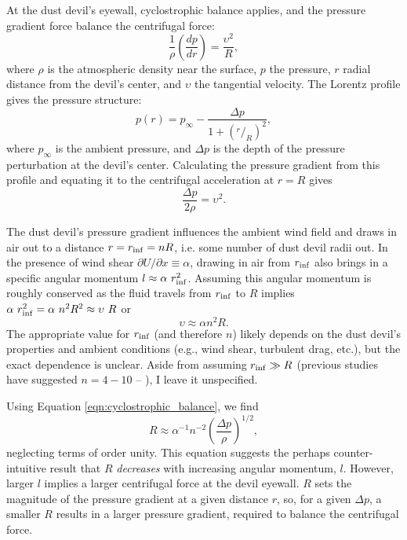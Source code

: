 \documentclass{aastex63}
\begin{document}
At the dust devil's eyewall, cyclostrophic balance applies, and the pressure gradient force balance the centrifugal force:
\begin{equation}
    \dfrac{1}{\rho}\left( \dfrac{dp}{dr} \right) = \dfrac{\upsilon^2}{R},
\end{equation}
where $\rho$ is the atmospheric density near the surface, $p$ the pressure, $r$ radial distance from the devil's center, and $\upsilon$ the tangential velocity. The Lorentz profile gives the pressure structure:
\begin{equation}
    p(r) = p_{\infty} - \dfrac{\Delta p}{1 + \left( ^r/_R \right)^2},\label{eqn:pressure_profile}
\end{equation}
where $p_{\infty}$ is the ambient pressure, and $\Delta p$ is the depth of the pressure perturbation at the devil's center. Calculating the pressure gradient from this profile and equating it to the centrifugal acceleration at $r = R$ gives
\begin{equation}
    \dfrac{\Delta p}{2\rho} = \upsilon^2.\label{eqn:cyclostrophic_balance}
\end{equation}

The dust devil's pressure gradient influences the ambient wind field and draws in air out to a distance $r = r_{\rm inf} = n R$, i.e. some number of dust devil radii out. In the presence of wind shear $\partial U/\partial x \equiv \alpha$, drawing in air from $r_{\rm inf}$ also brings in a specific angular momentum $l \approx \alpha\ r_{\rm inf}^2$. Assuming this angular momentum is roughly conserved as the fluid travels from $r_{\rm inf}$ to $R$ implies $\alpha\ r_{\rm inf}^2 = \alpha\ n^2 R^2 \approx \upsilon\ R$ or 
\begin{equation}
    \upsilon \approx \alpha n^2 R.
\end{equation}
The appropriate value for $r_{\rm inf}$ (and therefore $n$) likely depends on the dust devil's properties and ambient conditions (e.g., wind shear, turbulent drag, etc.), but the exact dependence is unclear. Aside from assuming $r_{\rm inf} \gg R$ (previous studies have suggested $n = 4-10$ -- \citealp{2001JAtS...58..927R}), I leave it unspecified.

Using Equation \ref{eqn:cyclostrophic_balance}, we find
\begin{equation}
    R \approx \alpha^{-1} n^{-2} \left( \dfrac{\Delta p}{\rho} \right)^{1/2},\label{eqn:R_vs_Delta-p}
\end{equation}
neglecting terms of order unity. This equation suggests the perhaps counter-intuitive result that $R$ \emph{decreases} with increasing angular momentum, $l$. However, larger $l$ implies a larger centrifugal force at the devil eyewall. $R$ sets the magnitude of the pressure gradient at a given distance $r$, so, for a given $\Delta p$, a smaller $R$ results in a larger pressure gradient, required to balance the centrifugal force.
\end{document}
